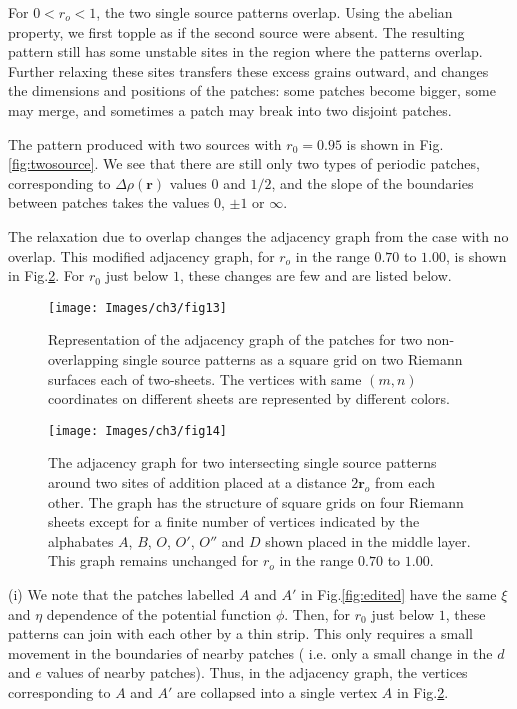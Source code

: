\documentclass[11pt,a4paper]{book}
\begin{document}
For $ 0 < r_{o} <1$, the two single source patterns overlap. Using the abelian property, we first topple 
as if the second source were absent. The resulting pattern still has some
unstable sites in the region where the patterns overlap. 
Further relaxing these sites transfers these excess grains outward,
and changes the dimensions and positions of the patches: some patches become bigger,
some may merge, and sometimes a patch may break into two disjoint patches.  

The pattern produced with two sources with $r_0 = 0.95$ is shown in Fig.\ref{fig:twosource}. We see that there are still
only two types of periodic patches, corresponding to $\Delta\rho(\mathbf{r})$ values $0$
and $1/2$,  and the slope of the boundaries between patches takes the values 
$0$, $\pm1$ or $\infty$. 

The relaxation due to overlap changes the adjacency graph from the case with 
no overlap. This modified adjacency graph, for $r_{o}$ in the range
$0.70$ to $1.00$, is shown in Fig.\ref{fig:adj}.
For $r_0$ just below $1$, these changes are few and are listed below.
\begin{figure}
\begin{center}
\texttt{[image: Images/ch3/fig13]}
\end{center}
\caption{ Representation of the adjacency graph of the patches for two non-overlapping single source patterns
as a square grid on two Riemann surfaces each of two-sheets. The vertices with same $(m,n)$ coordinates on different sheets are represented by different colors.}
\label{fig:adjnocol}
\end{figure}
\begin{figure}
\begin{center}
\texttt{[image: Images/ch3/fig14]}
\end{center}
\caption{ The adjacency graph for two intersecting single source patterns around two 
sites of addition placed at a distance $2 \mathbf{r}_o$ from each other. The graph
has the structure of square grids on four Riemann sheets except for a finite number
of vertices indicated by the alphabates $A$, $B$, $O$, $O'$, $O''$ and $D$ shown placed
in the middle layer. This graph remains unchanged for $r_{o}$ in the range $0.70$ to $1.00$.}
\label{fig:adj}
\end{figure}

(i) We note that the patches labelled $A$ and $A'$ in Fig.\ref{fig:edited} have the same
$\xi$ and $\eta$ dependence of the potential function $\phi$. Then, for $r_0$ just below $1$, these patterns can
join with each other by a thin  strip. This only requires a small movement in the
boundaries of nearby patches ( i.e.  only a small change  in the $d$ and $e$ values
of nearby patches). Thus, in the adjacency graph, the vertices corresponding to $A$
and $A'$ are collapsed into a single vertex $A$ in Fig.\ref{fig:adj}. 
\end{document}
